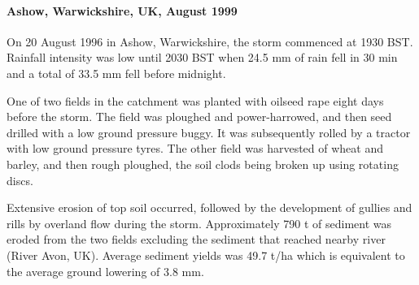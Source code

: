 \paragraph{Ashow, Warwickshire, UK, August 1999 \citep{harrison1999-143}}
\label{sec:AshowWarwickshireUK}
On 20 August 1996 in Ashow, Warwickshire, the storm commenced at 1930 BST.
Rainfall intensity was low until 2030 BST when 24.5 mm of rain fell in 30 min
and a total of 33.5 mm fell before midnight.

One of two fields in the catchment was planted with oilseed rape eight days
before the storm. The field was ploughed and power-harrowed, and then seed
drilled with a low ground pressure buggy. It was subsequently rolled by a
tractor with low ground pressure tyres. The other field was harvested of wheat
and barley, and then rough ploughed, the soil clods being broken up using
rotating discs.

Extensive erosion of top soil occurred, followed by the development of gullies
and rills by overland flow during the storm. Approximately 790 t of sediment was
eroded from the two fields excluding the sediment that reached nearby river
(River Avon, UK). Average sediment yields was 49.7 t/ha which is equivalent to
the average ground lowering of 3.8 mm.
